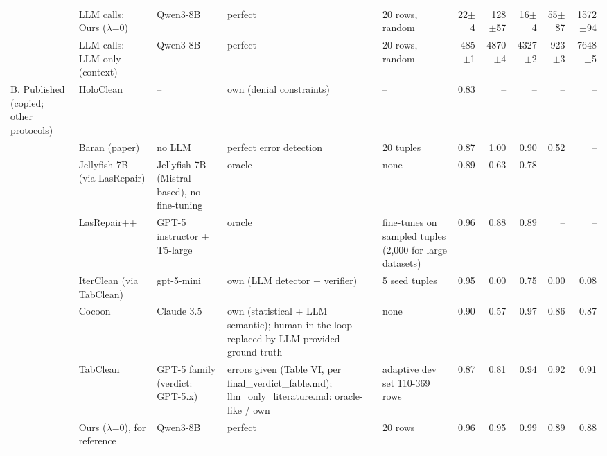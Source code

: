 \begin{table}[t]
{\begin{tabular}{p{1.9cm}p{3.8cm}p{2.2cm}p{2.4cm}p{2.2cm}rrrrr}
 & LLM calls: Ours ($\lambda$=0) & Qwen3-8B & perfect & 20 rows, random & 22$\pm$4 & 128$\pm$57 & 16$\pm$4 & 55$\pm$87 & 1572$\pm$94 \\
 & LLM calls: LLM-only (context) & Qwen3-8B & perfect & 20 rows, random & 485$\pm$1 & 4870$\pm$4 & 4327$\pm$2 & 923$\pm$3 & 7648$\pm$5 \\
\midrule
B. Published (copied; other protocols) & HoloClean & -- & own (denial constraints) & -- & 0.83 & -- & -- & -- & -- \\
 & Baran (paper) & no LLM & perfect error detection & 20 tuples & 0.87 & 1.00 & 0.90 & 0.52 & -- \\
 & Jellyfish-7B (via LasRepair) & Jellyfish-7B (Mistral-based), no fine-tuning & oracle & none & 0.89 & 0.63 & 0.78 & -- & -- \\
 & LasRepair++ & GPT-5 instructor + T5-large & oracle & fine-tunes on sampled tuples (2,000 for large datasets) & 0.96 & 0.88 & 0.89 & -- & -- \\
 & IterClean (via TabClean) & gpt-5-mini & own (LLM detector + verifier) & 5 seed tuples & 0.95 & 0.00 & 0.75 & 0.00 & 0.08 \\
 & Cocoon & Claude 3.5 & own (statistical + LLM semantic); human-in-the-loop replaced by LLM-provided ground truth & none & 0.90 & 0.57 & 0.97 & 0.86 & 0.87 \\
 & TabClean & GPT-5 family (verdict: GPT-5.x) & errors given (Table VI, per final\_verdict\_fable.md); llm\_only\_literature.md: oracle-like / own & adaptive dev set 110-369 rows & 0.87 & 0.81 & 0.94 & 0.92 & 0.91 \\
 & Ours ($\lambda$=0), for reference & Qwen3-8B & perfect & 20 rows & 0.96 & 0.95 & 0.99 & 0.89 & 0.88 \\
\bottomrule
\end{tabular}}

\end{table}
